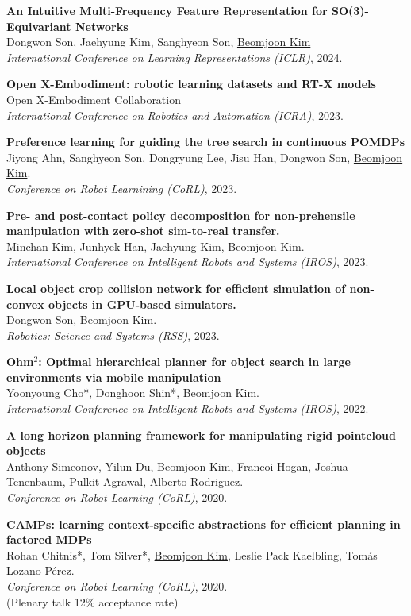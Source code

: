 \documentclass[line,margin,letterpaper]{res}
\begin{document}
\begin{resume}
\textbf{An Intuitive Multi-Frequency Feature Representation for SO(3)-Equivariant Networks }\\
Dongwon Son, Jaehyung Kim, Sanghyeon Son, \underline{Beomjoon Kim} \\
{\sl International Conference on Learning Representations (ICLR)}, 2024.

\textbf{Open X-Embodiment: robotic learning datasets and RT-X models}\\
Open X-Embodiment Collaboration \\
{\sl International Conference on Robotics and Automation (ICRA)}, 2023.


\textbf{Preference learning for guiding the tree search in continuous POMDPs
}\\
Jiyong Ahn, Sanghyeon Son, Dongryung Lee, Jisu Han, Dongwon Son, \underline{Beomjoon Kim}. \\
{\sl Conference on Robot Learnining (CoRL)}, 2023.


\textbf{Pre- and post-contact policy decomposition for non-prehensile manipulation with zero-shot sim-to-real transfer.
}\\
Minchan Kim, Junhyek Han, Jaehyung Kim, \underline{Beomjoon Kim}. \\
{\sl International Conference on Intelligent Robots and Systems (IROS)}, 2023.


\textbf{Local object crop collision network for efficient simulation of non-convex objects in GPU-based simulators.
}\\
Dongwon Son, \underline{Beomjoon Kim}. \\
{\sl Robotics: Science and Systems (RSS)}, 2023.

\textbf{Ohm$^2$: Optimal hierarchical planner for object search in large environments via mobile manipulation}\\
Yoonyoung Cho*, Donghoon Shin*, \underline{Beomjoon Kim}. \\
{\sl International Conference on Intelligent Robots and Systems (IROS)}, 2022.

\textbf{A long horizon planning framework for manipulating rigid pointcloud objects}\\
Anthony Simeonov, Yilun Du, \underline{Beomjoon Kim}, Francoi Hogan, Joshua Tenenbaum, Pulkit Agrawal, Alberto Rodriguez.\\
{\sl Conference on Robot Learning (CoRL)}, 2020.

\textbf{CAMPs: learning context-specific abstractions for efficient planning in factored MDPs}\\
Rohan Chitnis*, Tom Silver*, \underline{Beomjoon Kim}, Leslie Pack Kaelbling, Tom\'as Lozano-P\'erez.\\
{\sl Conference on Robot Learning (CoRL)}, 2020.\\
{\small (Plenary talk 12\% acceptance rate)}


\end{resume}
\end{document}
